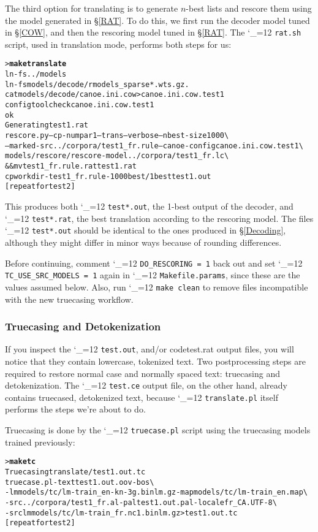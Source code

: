\documentclass[11pt,letterpaper]{article}
\newcommand{\bs}{\textbackslash{}}
\def\code{\begingroup\catcode`\_=12 \codex}
\newcommand{\codex}[1]{\texttt{#1}\endgroup}
\begin{document}
The third option for translating is to generate $n$-best lists and rescore
them using the model generated in \S\ref{RAT}. To do this, we first run
the decoder model tuned in \S\ref{COW}, and then the rescoring model
tuned in \S\ref{RAT}.  The \code{rat.sh} script, used in translation
mode, performs both steps for us:
\begin{small}
\begin{alltt}
   > \textbf{make translate}
   ln -fs ../models
   ln -fs models/decode/rmodels_sparse*.wts.gz .
   cat models/decode/canoe.ini.cow > canoe.ini.cow.test1
   configtool check canoe.ini.cow.test1
   ok
   Generating test1.rat
   rescore.py --cp-numpar 1 --trans --verbose --nbest-size 1000 \bs
      --marked-src ../corpora/test1_fr.rule --canoe-config canoe.ini.cow.test1 \bs
      models/rescore/rescore-model ../corpora/test1_fr.lc \bs
      && mv test1_fr.rule.rat test1.rat
   cp workdir-test1_fr.rule-1000best/1best test1.out
   [repeat for test2]
\end{alltt}
\end{small}
This produces both \code{test*.out}, the 1-best output of the decoder, and
\code{test*.rat}, the best translation according to the rescoring model.  The
files \code{test*.out} should be identical to the ones produced in
\S\ref{Decoding}, although they might differ in minor ways because of
rounding differences.

Before continuing, comment \code{DO_RESCORING = 1} back out and set
\code{TC_USE_SRC_MODELS = 1} again in \code{Makefile.params}, since these are
the values assumed below.  Also, run \code{make clean} to remove files
incompatible with the new truecasing workflow.

\subsubsection{Truecasing and Detokenization} \label{Truecasing}

If you inspect the \code{test.out}, and/or code{test.rat} output files, you will
notice that they contain lowercase, tokenized text.  Two postprocessing steps
are required to restore normal case and normally spaced text: truecasing and
detokenization.  The \code{test.ce} output file, on the other hand, already
contains truecased, detokenized text, because \code{translate.pl} itself
performs the steps we're about to do.

Truecasing is done by the \code{truecase.pl} script using the truecasing models
trained previously:
\begin{small}
\begin{alltt}
   > \textbf{make tc}
   Truecasing translate/test1.out.tc
   truecase.pl -text test1.out.oov -bos \bs
      -lm models/tc/lm-train_en-kn-3g.binlm.gz -map models/tc/lm-train_en.map \bs
      -src ../corpora/test1_fr.al -pal test1.out.pal -locale fr_CA.UTF-8 \bs
      -srclm models/tc/lm-train_fr.nc1.binlm.gz > test1.out.tc
   [repeat for test2]
\end{alltt}
\end{small}
\end{document}
